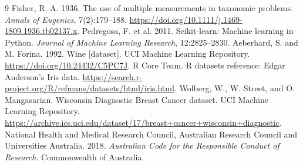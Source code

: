 \documentclass[11pt]{article}
\begin{document}
\begin{thebibliography}{9}
 Fisher, R. A. 1936. The use of multiple measurements in taxonomic problems. \textit{Annals of Eugenics}, 7(2):179--188. \url{https://doi.org/10.1111/j.1469-1809.1936.tb02137.x}.
 Pedregosa, F. et al. 2011. Scikit-learn: Machine learning in Python. \textit{Journal of Machine Learning Research}, 12:2825--2830.
 Aeberhard, S. and M. Forina. 1992. Wine [dataset]. UCI Machine Learning Repository. \url{https://doi.org/10.24432/C5PC7J}.
 R Core Team. R datasets reference: Edgar Anderson's Iris data. \url{https://search.r-project.org/R/refmans/datasets/html/iris.html}.
 Wolberg, W., W. Street, and O. Mangasarian. Wisconsin Diagnostic Breast Cancer dataset. UCI Machine Learning Repository. \url{https://archive.ics.uci.edu/dataset/17/breast+cancer+wisconsin+diagnostic}.
 National Health and Medical Research Council, Australian Research Council and Universities Australia. 2018. \textit{Australian Code for the Responsible Conduct of Research}. Commonwealth of Australia.
\end{thebibliography}
\end{document}
